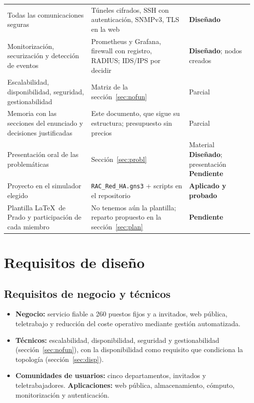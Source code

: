 \documentclass[11pt,a4paper]{article}
\newcommand{\cod}[1]{\texttt{#1}}
\newcommand{\ok}{\textcolor{verde}{\textbf{Aplicado y probado}}}
\newcommand{\dis}{\textcolor{azul}{\textbf{Diseñado}}}
\newcommand{\pen}{\textcolor{rojo}{\textbf{Pendiente}}}
\begin{document}
\begin{longtable}{@{}p{3.3cm}p{8.4cm}p{4.8cm}@{}}
Todas las comunicaciones seguras & Túneles cifrados, SSH con autenticación, SNMPv3, TLS en la web & \dis\\
Monitorización, securización y detección de eventos & Prometheus y Grafana, firewall con registro, RADIUS; IDS/IPS por decidir & \dis; nodos creados\\
Escalabilidad, disponibilidad, seguridad, gestionabilidad & Matriz de la sección~\ref{sec:nofun} & Parcial\\
Memoria con las secciones del enunciado y decisiones justificadas & Este documento, que sigue su estructura; presupuesto sin precios & Parcial\\
Presentación oral de las problemáticas & Sección~\ref{sec:probl} & Material \dis; presentación \pen\\
Proyecto en el simulador elegido & \cod{RAC\_Red\_HA.gns3} + scripts en el repositorio & \ok\\
Plantilla \LaTeX\ de Prado y participación de cada miembro & No tenemos aún la plantilla; reparto propuesto en la sección~\ref{sec:plan} & \pen\\
\bottomrule
\end{longtable}
\endgroup

\section{Requisitos de diseño}
\subsection{Requisitos de negocio y técnicos}
\begin{itemize}
\item \textbf{Negocio:} servicio fiable a 260 puestos fijos y a invitados, web pública, teletrabajo y reducción del coste operativo mediante gestión automatizada.
\item \textbf{Técnicos:} escalabilidad, disponibilidad, seguridad y gestionabilidad (sección~\ref{sec:nofun}), con la disponibilidad como requisito que condiciona la topología (sección~\ref{sec:disp}).
\item \textbf{Comunidades de usuarios:} cinco departamentos, invitados y teletrabajadores. \textbf{Aplicaciones:} web pública, almacenamiento, cómputo, monitorización y autenticación.
\end{itemize}
\end{document}
